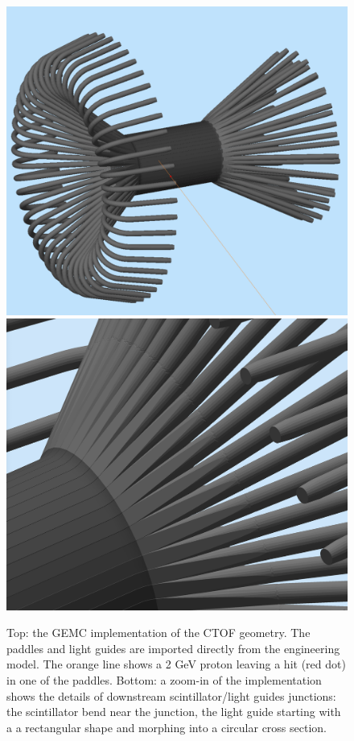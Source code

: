 \begin{figure}
	\centering
	\includegraphics[width=0.95\columnwidth,keepaspectratio]{img/ctofGeometry.png}
	\includegraphics[width=0.95\columnwidth,keepaspectratio]{img/ctofDetail.png}
	\caption{Top: the GEMC implementation of the CTOF geometry. The paddles and light guides are imported directly from the engineering model.
			   The orange line shows a 2 GeV proton leaving a hit (red dot) in one of the paddles.
				Bottom: a zoom-in of the implementation shows the details of downstream scintillator/light guides junctions: the scintillator bend near the junction, the light guide starting
				with a a rectangular shape and morphing into a circular cross section.}
	\label{fig:ctofGeometry}
\end{figure}



